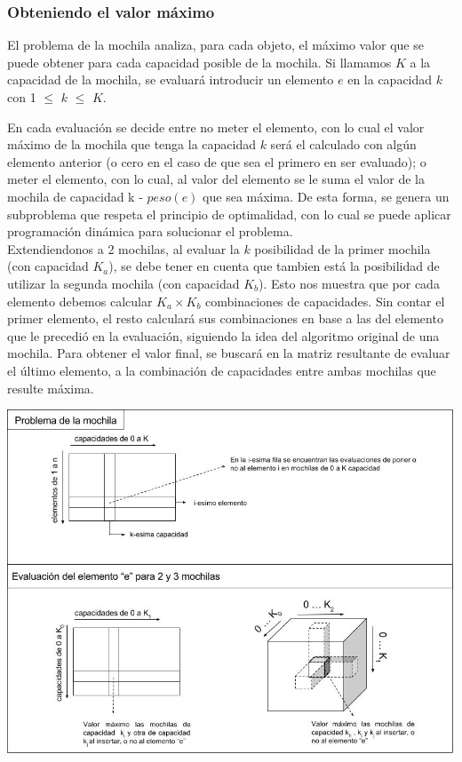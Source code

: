 \subsubsection*{Obteniendo el valor máximo}
 El problema de la mochila analiza, para cada objeto, el máximo valor que se puede obtener para cada capacidad posible de la mochila. Si llamamos $K$ a la capacidad de la mochila, se evaluará introducir un elemento $e$ en la capacidad $k$ con 1 $\leq$ $k$ $\leq$ $K$. 

En cada evaluación se decide entre no meter el elemento, con lo cual el valor máximo de la mochila que tenga la capacidad $k$ será el calculado con algún elemento anterior (o cero en el caso de que sea el primero en ser evaluado); o meter el elemento, con lo cual, al valor del elemento se le suma el valor de la mochila de capacidad k - $peso(e)$ que sea máxima. De esta forma, se genera un subproblema que respeta el principio de optimalidad, con lo cual se puede aplicar programación dinámica para solucionar el problema. \\
 
  Extendiendonos a 2 mochilas, al evaluar la $k$ posibilidad de la primer mochila (con capacidad $K_{a}$), se debe tener en cuenta que tambien está la posibilidad de utilizar la segunda mochila (con capacidad $K_{b}$). Esto nos muestra que por cada elemento debemos calcular $K_{a} \times K_{b}$ combinaciones de capacidades. Sin contar el primer elemento, el resto calculará sus combinaciones en base a las del elemento que le precedió en la evaluación, siguiendo la idea del algoritmo original de una mochila. Para obtener el valor final, se buscará en la matriz resultante de evaluar el último elemento, a la combinación de capacidades entre ambas mochilas que resulte máxima.\\
  
  \vspace*{0.3cm} \vspace*{0.3cm}
  \begin{center}
 \includegraphics[scale=0.6]{./EJ3/dibujo-matrices.jpg}
  \end{center}
  \vspace*{0.3cm}
  
